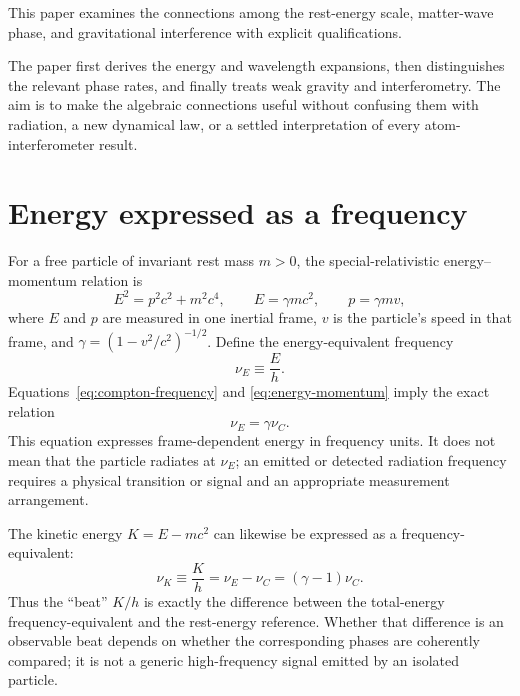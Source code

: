 \documentclass[12pt]{article}
\begin{document}
This paper examines the connections among the rest-energy scale, matter-wave phase, and gravitational interference with explicit qualifications.

The paper first derives the energy and wavelength expansions, then distinguishes the relevant phase rates, and finally treats weak gravity and interferometry. The aim is to make the algebraic connections useful without confusing them with radiation, a new dynamical law, or a settled interpretation of every atom-interferometer result.

\section{Energy expressed as a frequency}

For a free particle of invariant rest mass $m>0$, the special-relativistic energy--momentum relation is
\begin{equation}
  E^2=p^2c^2+m^2c^4,
  \qquad
  E=\gamma mc^2,
  \qquad
  p=\gamma mv,
  \label{eq:energy-momentum}
\end{equation}
where $E$ and $p$ are measured in one inertial frame, $v$ is the particle's speed in that frame, and $\gamma=(1-v^2/c^2)^{-1/2}$. Define the energy-equivalent frequency
\begin{equation}
  \nu_E\equiv\frac{E}{h}.
  \label{eq:energy-frequency}
\end{equation}
Equations~\eqref{eq:compton-frequency} and \eqref{eq:energy-momentum} imply the exact relation
\begin{equation}
  \boxed{\nu_E=\gamma\nu_C.}
  \label{eq:gamma-frequency}
\end{equation}
This equation expresses frame-dependent energy in frequency units. It does not mean that the particle radiates at $\nu_E$; an emitted or detected radiation frequency requires a physical transition or signal and an appropriate measurement arrangement.

The kinetic energy $K=E-mc^2$ can likewise be expressed as a frequency-equivalent:
\begin{equation}
  \nu_K\equiv\frac{K}{h}=\nu_E-\nu_C=(\gamma-1)\nu_C.
  \label{eq:kinetic-frequency}
\end{equation}
Thus the ``beat'' $K/h$ is exactly the difference between the total-energy frequency-equivalent and the rest-energy reference. Whether that difference is an observable beat depends on whether the corresponding phases are coherently compared; it is not a generic high-frequency signal emitted by an isolated particle.
\end{document}

